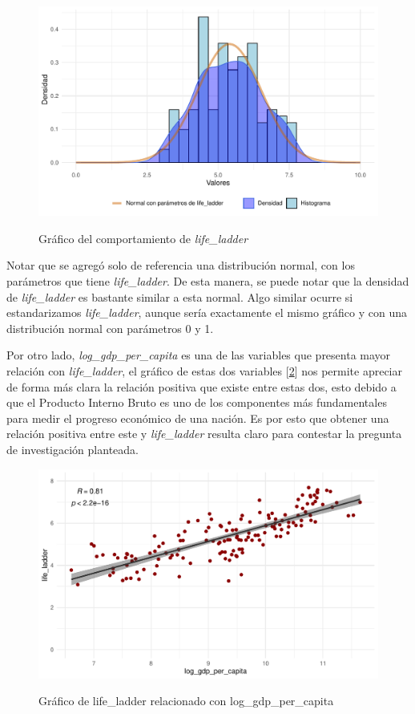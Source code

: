 \begin{figure}[H]
    \centering
    \caption{Gráfico del comportamiento de \textit{life\_ladder}}
    \includegraphics[width=1\textwidth]{figures/life_ladder.pdf}
    \label{fig:life_ladder}
\end{figure}

Notar que se agregó solo de referencia una distribución normal, con los parámetros que tiene \textit{life\_ladder}. De esta manera, se puede notar que la densidad de \textit{life\_ladder} es bastante similar a esta normal. Algo similar ocurre si estandarizamos \textit{life\_ladder}, aunque sería exactamente el mismo gráfico y con una distribución normal con parámetros 0 y 1. 

\pagebreak

Por otro lado, \textit{log\_gdp\_per\_capita} es una de las variables que presenta mayor relación con \textit{life\_ladder}, el gráfico de estas dos variables [\ref{fig:lgdp_life}] nos permite apreciar de forma más clara la relación positiva que existe entre estas dos, esto debido a que el Producto Interno Bruto es uno de los componentes más fundamentales para medir el progreso económico de una nación. Es por esto que obtener una relación positiva entre este y \textit{life\_ladder} resulta claro para contestar la pregunta de investigación planteada.

\begin{figure}[H]
    \centering
    \caption{Gráfico de life\_ladder relacionado con log\_gdp\_per\_capita}
    \includegraphics[width=1\textwidth]{figures/lgdp_life.pdf}
    \label{fig:lgdp_life}
\end{figure}

